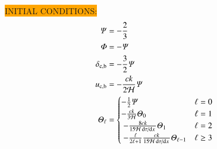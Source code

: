 


\noindent\colorbox{orange}{INITIAL CONDITIONS:}
\begin{subequations}\label{mil3:theo:eq:initial_conditions}
\begin{align}
    \Psi     &= -\frac{2}{3}     \label{mil3:theo:eq:init_Psi}\\
    \Phi     &= -\Psi         \label{mil3:theo:eq:init_Phi}\\
    \delta\ped{c, b}&= -\frac{3}{2} \Psi     \label{mil3:theo:eq:init_delta}\\
    u\ped{c, b}     &= -\frac{ck}{2\Hp} \Psi \label{mil3:theo:eq:init_u}\\
    \Theta_\ell &=\begin{cases}
        -\frac{1}{2}\Psi     & \ell = 0 \\
        -\frac{ck}{3\Hp} \Theta_0 & \ell = 1 \\ 
        -\frac{8ck}{15\Hp\dv*{\tau}{x}}\Theta_1    & \ell = 2 \\ 
        -\frac{\ell}{2\ell+1} \frac{ck}{15\Hp\dv*{\tau}{x}} \Theta_{\ell-1} &\ell \geq 3
    \end{cases} \label{mil3:theo:eq:init_Theta}
\end{align}
\end{subequations}


